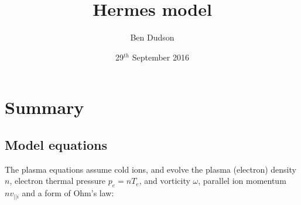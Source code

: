 \documentclass[12pt,a4paper]{article}
\title{ Hermes model }%
\author{ Ben Dudson }%
\date{ 29$^{th}$ September 2016 }%
\begin{document}
\maketitle %
\thispagestyle{fancy}%

\section{Summary}

\subsection{Model equations}

The plasma equations assume cold ions, and evolve the plasma (electron) density $n$, electron thermal pressure $p_e = nT_e$,
and vorticity $\omega$, parallel ion momentum $nv_{||i}$ and
a form of Ohm's law:
\end{document}
